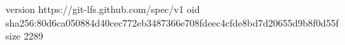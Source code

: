 version https://git-lfs.github.com/spec/v1
oid sha256:80d6ca050884d40cec772eb3487366e708fdeec4cfde8bd7d20655d9b8f0d55f
size 2289
